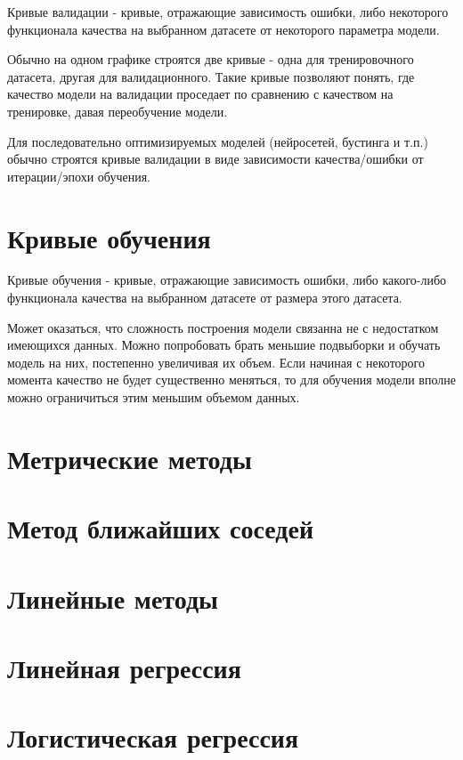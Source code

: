 Кривые валидации - кривые, отражающие зависимость ошибки, либо некоторого функционала качества на выбранном датасете от некоторого параметра модели. 

Обычно на одном графике строятся две кривые - одна для тренировочного датасета, другая для валидационного. Такие кривые позволяют понять, где качество модели на валидации проседает по сравнению с качеством на тренировке, давая переобучение модели.

Для последовательно оптимизируемых моделей (нейросетей, бустинга и т.п.) обычно строятся кривые валидации в виде зависимости качества/ошибки от итерации/эпохи обучения.

\section{Кривые обучения}

Кривые обучения - кривые, отражающие зависимость ошибки, либо какого-либо функционала качества на выбранном датасете от размера этого датасета.

Может оказаться, что сложность построения модели связанна не с недостатком имеющихся данных. Можно попробовать брать меньшие подвыборки и обучать модель на них, постепенно увеличивая их объем. Если начиная с некоторого момента качество не будет существенно меняться, то для обучения модели вполне можно ограничиться этим меньшим объемом данных.

\section{Метрические методы}


\section{Метод ближайших соседей}


\section{Линейные методы}


\section{Линейная регрессия}


\section{Логистическая регрессия}

